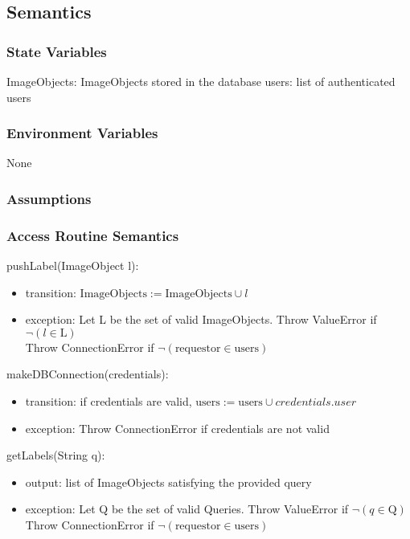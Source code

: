 \documentclass[12pt, titlepage]{article}
\begin{document}
  \subsection{Semantics}
  
  \subsubsection{State Variables}
  
  ImageObjects: ImageObjects stored in the database
  users: list of authenticated users
  
  \subsubsection{Environment Variables}
  
  None
  
  \subsubsection{Assumptions}
  
  
  \subsubsection{Access Routine Semantics}
  
  \noindent pushLabel(ImageObject l):
  \begin{itemize}
  \item transition: $\text{ImageObjects} := \text{ImageObjects} \cup l $
  \item exception: Let L be the set of valid ImageObjects. Throw ValueError if $\neg (l \in \text{L})$\\
  Throw ConnectionError if $\neg (\text{requestor} \in \text{users})$
  \end{itemize}

  \noindent makeDBConnection(credentials):
  \begin{itemize}
  \item transition: if credentials are valid, $\text{users} := \text{users} \cup credentials.user $
  \item exception: Throw ConnectionError if credentials are not valid
  \end{itemize}

  \noindent getLabels(String q):
  \begin{itemize}
  \item output: list of ImageObjects satisfying the provided query
  \item exception: Let Q be the set of valid Queries. Throw ValueError if $\neg (q \in \text{Q})$\\
  Throw ConnectionError if $\neg (\text{requestor} \in \text{users})$

  \end{itemize}
  
\end{document}
